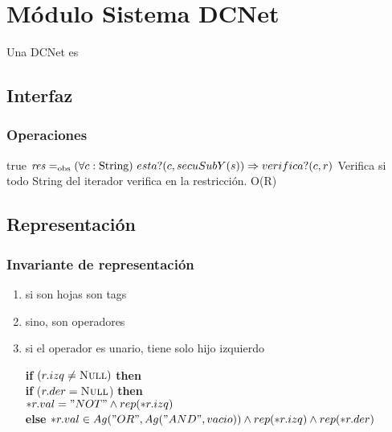 
\section{Módulo Sistema DCNet}

Una DCNet es

\subsection{Interfaz}


\subsubsection*{Operaciones}

 {true}
 {$\var{res} \igobs (\paratodo{String}{c}) \ esta?(c,secuSubY(s)) \Rightarrow verifica?(c,r)$}
 {Verifica si todo String del iterador verifica en la restricción.}
 {O(R)}


\subsection{Representación}





\subsubsection*{Invariante de representación}

\begin{enumerate}
	\item si son hojas son tags
	\item sino, son operadores
	\item si el operador es unario, tiene solo hijo izquierdo

		 \textbf{if} $(r.izq \neq \NULL)$ \textbf{then} \\
		\textbf{if} ($r.der = \NULL$) \textbf{then} \\
		$*r.val = "NOT" \land rep(*r.izq)$ \\
		\textbf{else} $*r.val \in Ag("OR", Ag("AND",vacio)) \land rep(*r.izq) \land rep(*r.der)$
		\end{enumerate}

